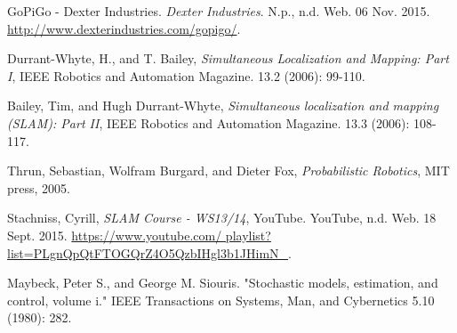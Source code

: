 \documentclass[conference]{IEEEtran}
\begin{document}

















%
%
%
\begin{thebibliography}{1}

GoPiGo - Dexter Industries. \emph{Dexter Industries}. N.p., n.d. Web. 06 Nov. 2015. \url{http://www.dexterindustries.com/gopigo/}.

Durrant-Whyte, H., and T. Bailey, \emph{Simultaneous Localization and Mapping: Part I}, IEEE Robotics and Automation Magazine. 13.2 (2006): 99-110.

Bailey, Tim, and Hugh Durrant-Whyte, \emph{Simultaneous localization and mapping (SLAM): Part II}, IEEE Robotics and Automation Magazine. 13.3 (2006): 108-117.

Thrun, Sebastian, Wolfram Burgard, and Dieter Fox, \emph{Probabilistic Robotics}, MIT press, 2005.

Stachniss, Cyrill, \emph{SLAM Course - WS13/14}, YouTube. YouTube, n.d. Web. 18 Sept. 2015. \url{https://www.youtube.com/ playlist?list=PLgnQpQtFTOGQrZ4O5QzbIHgl3b1JHimN_}.

Maybeck, Peter S., and George M. Siouris. "Stochastic models, estimation, and control, volume i." IEEE Transactions on Systems, Man, and Cybernetics 5.10 (1980): 282.

\end{thebibliography}
\end{document}
